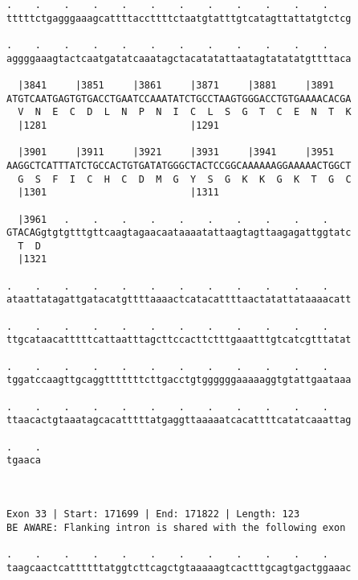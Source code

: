 \documentclass{article}
\begin{document}
\begin{Verbatim}
.    .    .    .    .    .    .    .    .    .    .    .    
tttttctgagggaaagcattttaccttttctaatgtatttgtcatagttattatgtctcg
                                                            
.    .    .    .    .    .    .    .    .    .    .    .    
aggggaaagtactcaatgatatcaaatagctacatatattaatagtatatatgttttaca
                                                            
  |3841     |3851     |3861     |3871     |3881     |3891   
ATGTCAATGAGTGTGACCTGAATCCAAATATCTGCCTAAGTGGGACCTGTGAAAACACGA
  V  N  E  C  D  L  N  P  N  I  C  L  S  G  T  C  E  N  T  K
  |1281                         |1291                       
  
  |3901     |3911     |3921     |3931     |3941     |3951   
AAGGCTCATTTATCTGCCACTGTGATATGGGCTACTCCGGCAAAAAAGGAAAAACTGGCT
  G  S  F  I  C  H  C  D  M  G  Y  S  G  K  K  G  K  T  G  C
  |1301                         |1311                       
  
  |3961   .    .    .    .    .    .    .    .    .    .    
GTACAGgtgtgtttgttcaagtagaacaataaaatattaagtagttaagagattggtatc
  T  D                                                      
  |1321                                                     
  
.    .    .    .    .    .    .    .    .    .    .    .    
ataattatagattgatacatgttttaaaactcatacattttaactatattataaaacatt
                                                            
.    .    .    .    .    .    .    .    .    .    .    .    
ttgcataacatttttcattaatttagcttccacttctttgaaatttgtcatcgtttatat
                                                            
.    .    .    .    .    .    .    .    .    .    .    .    
tggatccaagttgcaggtttttttcttgacctgtggggggaaaaaggtgtattgaataaa
                                                            
.    .    .    .    .    .    .    .    .    .    .    .    
ttaacactgtaaatagcacatttttatgaggttaaaaatcacattttcatatcaaattag
                                                            
.    .
tgaaca
      
      
 
Exon 33 | Start: 171699 | End: 171822 | Length: 123
BE AWARE: Flanking intron is shared with the following exon
 
.    .    .    .    .    .    .    .    .    .    .    .    
taagcaactcattttttatggtcttcagctgtaaaaagtcactttgcagtgactggaaac
                                                            

\end{Verbatim}
\end{document}
